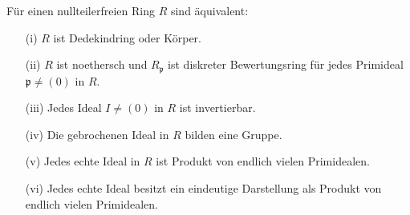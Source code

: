 \begin{Satz}\label{Satz13}
F\"ur einen nullteilerfreien Ring $R$ sind \"aquivalent:

\begin{enumerate}
\item[(i)] $R$ ist Dedekindring oder K\"orper.

\item[(ii)] $R$ ist noethersch und $R_\mathfrak{p}$ ist diskreter Bewertungsring f\"ur jedes Primideal $\mathfrak{p} \neq (0)$ in $R$.

\item[(iii)] Jedes Ideal $I \neq (0)$ in $R$ ist invertierbar.

\item[(iv)] Die gebrochenen Ideal in $R$ bilden eine Gruppe.

\item[(v)] Jedes echte Ideal in $R$ ist Produkt von endlich vielen Primidealen.

\item[(vi)] Jedes echte Ideal besitzt ein eindeutige Darstellung als Produkt von endlich vielen Primidealen.
\end{enumerate}

\end{Satz}

